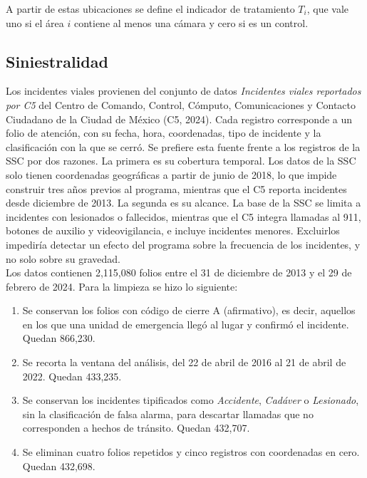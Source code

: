 A partir de estas ubicaciones se define el indicador de tratamiento $T_i$, que vale uno si el área $i$ contiene al menos una cámara y cero si es un control.

\subsection{Siniestralidad}

\noindent Los incidentes viales provienen del conjunto de datos \emph{Incidentes viales reportados por C5} del Centro de Comando, Control, Cómputo, Comunicaciones y Contacto Ciudadano de la Ciudad de México (C5, 2024). Cada registro corresponde a un folio de atención, con su fecha, hora, coordenadas, tipo de incidente y la clasificación con la que se cerró. Se prefiere esta fuente frente a los registros de la SSC por dos razones. La primera es su cobertura temporal. Los datos de la SSC solo tienen coordenadas geográficas a partir de junio de 2018, lo que impide construir tres años previos al programa, mientras que el C5 reporta incidentes desde diciembre de 2013. La segunda es su alcance. La base de la SSC se limita a incidentes con lesionados o fallecidos, mientras que el C5 integra llamadas al 911, botones de auxilio y videovigilancia, e incluye incidentes menores. Excluirlos impediría detectar un efecto del programa sobre la frecuencia de los incidentes, y no solo sobre su gravedad.\\

Los datos contienen 2,115,080 folios entre el 31 de diciembre de 2013 y el 29 de febrero de 2024. Para la limpieza se hizo lo siguiente:

\begin{enumerate}
    \item Se conservan los folios con código de cierre A (afirmativo), es decir, aquellos en los que una unidad de emergencia llegó al lugar y confirmó el incidente. Quedan 866,230.
    \item Se recorta la ventana del análisis, del 22 de abril de 2016 al 21 de abril de 2022. Quedan 433,235.
    \item Se conservan los incidentes tipificados como \emph{Accidente}, \emph{Cadáver} o \emph{Lesionado}, sin la clasificación de falsa alarma, para descartar llamadas que no corresponden a hechos de tránsito. Quedan 432,707.
    \item Se eliminan cuatro folios repetidos y cinco registros con coordenadas en cero. Quedan 432,698.
\end{enumerate}

